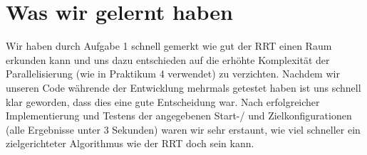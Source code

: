 \documentclass[a4paper]{scrartcl}
\begin{document}
	
\section*{Was wir gelernt haben}

 Wir haben durch Aufgabe 1 schnell gemerkt wie gut der RRT einen Raum erkunden kann und uns dazu entschieden auf die erhöhte Komplexität der Parallelisierung (wie in Praktikum 4 verwendet) zu verzichten. Nachdem wir unseren Code währende der Entwicklung mehrmals getestet haben ist uns schnell klar geworden, dass dies eine gute Entscheidung war. Nach erfolgreicher Implementierung und Testens der angegebenen Start-/ und Zielkonfigurationen (alle Ergebnisse unter 3 Sekunden) waren wir sehr erstaunt, wie viel schneller ein zielgerichteter Algorithmus wie der RRT doch sein kann.
\end{document}
